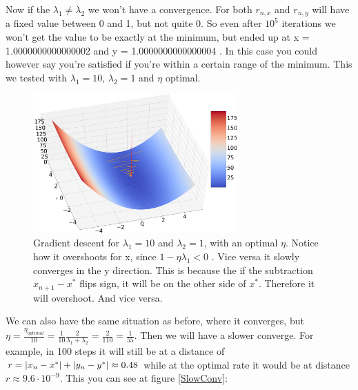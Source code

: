 \documentclass[a4paper]{article}
\begin{document}
Now if the $\lambda_1 \neq \lambda_2$ we won't have a convergence. For both $r_{n,x}$ and $r_{n,y}$ will have a fixed value between 0 and 1, but not quite 0. So even after $10^5$ iterations we won't get the value to be exactly at the minimum, but ended up at x = 1.0000000000000002 and y = 1.0000000000000004 . In this case you could however say you're satisfied if you're within a certain range of the minimum. This we tested with $\lambda_1 = 10$, $\lambda_2 = 1$ and $\eta$ optimal.


\begin{figure}[H]
\includegraphics[width=0.7\textwidth]{Images/ConvMany.png}
\caption{Gradient descent for $\lambda_1 = 10$ and $\lambda_2 = 1$, with an optimal $\eta$. Notice how it overshoots for x, since $1-\eta\lambda_1 < 0$ . Vice versa it slowly converges in the y direction. This is because the if the subtraction $x_{n+1} - x^*$ flips sign, it will be on the other side of $x^*$. Therefore it will overshoot. And vice versa.}
\end{figure}

\newpage

We can also have the same situation as before, where it converges, but $\eta = \frac{\eta_{optimal}}{10} = \frac{1}{10} \frac{2}{\lambda_1+\lambda_2} = \frac{2}{110} = \frac{1}{55}$. Then we will have a slower converge. For example, in 100 steps it will still be at a distance of $r = \abs{x_n - x^*} + \abs{y_n - y^*} \approx 0.48$ while at the optimal rate it would be at distance $r \approx 9.6\cdot 10^{-9}$. This you can see at figure \ref{SlowConv}:
\end{document}
